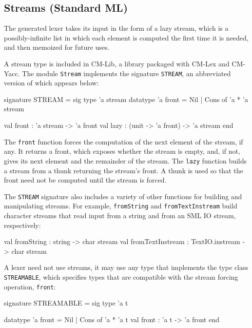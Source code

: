 \documentclass[10pt]{article}
\begin{document}
\subsection{Streams (Standard ML)}
\label{sec:stream-sml}

The generated lexer takes its input in the form of a lazy stream,
which is a possibly-infinite list in which each element is computed
the first time it is needed, and then memoized for future uses.

A stream type is included in CM-Lib, a library packaged with CM-Lex
and CM-Yacc.  The module {\tt Stream} implements the signature {\tt STREAM}, an
abbreviated version of which appears below:

\begin{code}
signature STREAM =
   sig
      type 'a stream
      datatype 'a front = Nil | Cons of 'a * 'a stream

      val front : 'a stream -> 'a front
      val lazy : (unit -> 'a front) -> 'a stream
   end
\end{code}


The {\tt front} function forces the computation of the next element of the
stream, if any.  It returns a front, which exposes whether the stream
is empty, and, if not, gives its next element and the remainder of the
stream.  The {\tt lazy} function builds a stream from a thunk returning
the stream's front.  A thunk is used so that the front need not be
computed until the stream is forced.

The {\tt STREAM} signature also includes a variety of other functions for
building and manipulating streams.  For example, {\tt fromString} and
{\tt fromTextInstream} build character streams that read input from a string
and from an SML IO stream, respectively:

\begin{code}
val fromString : string -> char stream
val fromTextInstream : TextIO.instream -> char stream
\end{code}

A lexer need not use streams, it may use any type that implements the
type class {\tt STREAMABLE}, which specifies types that are compatible with
the stream forcing operation, {\tt front}:

\begin{code}
signature STREAMABLE =
   sig
      type 'a t

      datatype 'a front = Nil | Cons of 'a * 'a t
      val front : 'a t -> 'a front
   end
\end{code}
\end{document}
